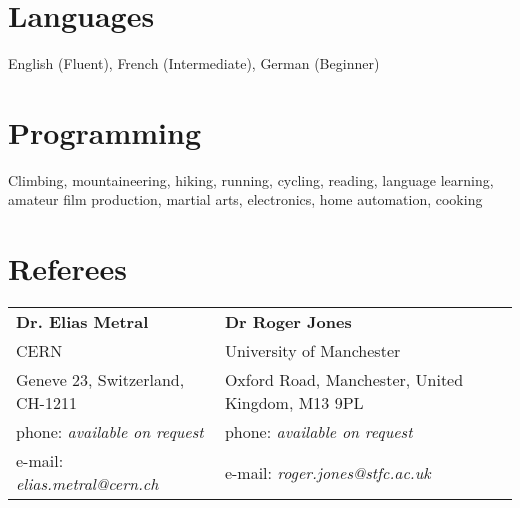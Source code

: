 \documentclass[margin,line]{resume}
\begin{document}
\begin{resume}
    \section{\mysidestyle Languages} 

   English (Fluent), French (Intermediate), German (Beginner)


    \section{\mysidestyle Programming} 

    Climbing, mountaineering, hiking, running, cycling, reading, language learning, amateur film production, martial arts, electronics, home automation, cooking






\section{\mysidestyle Referees} 

\begin{tabular}{@{}p{6cm}p{6cm}}
\textbf{Dr. Elias Metral}       &  \textbf{Dr Roger Jones}                   \\
CERN                     &  University of Manchester                      \\
Geneve 23, Switzerland, CH-1211           &  Oxford Road, Manchester, United Kingdom, M13 9PL        \\
phone: \textsl{available on request}    &  phone: \textsl{available on request}     \\
e-mail: \textsl{elias.metral@cern.ch}   &  e-mail: \textsl{roger.jones@stfc.ac.uk}    \\
\end{tabular}


\end{resume}
\end{document}
